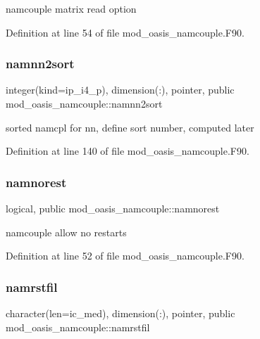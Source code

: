 namcouple matrix read option 



Definition at line 54 of file mod\+\_\+oasis\+\_\+namcouple.\+F90.

\mbox{\label{namespacemod__oasis__namcouple_a0ace7c451d8658759b9c8d871926a76e}} 
\subsubsection{\texorpdfstring{namnn2sort}{namnn2sort}}
{\footnotesize\ttfamily integer(kind=ip\+\_\+i4\+\_\+p), dimension(\+:), pointer, public mod\+\_\+oasis\+\_\+namcouple\+::namnn2sort}



sorted namcpl for nn, define sort number, computed later 



Definition at line 140 of file mod\+\_\+oasis\+\_\+namcouple.\+F90.

\mbox{\label{namespacemod__oasis__namcouple_ad1bd3ea485ad5f5114eb4b7f8c831ccb}} 
\subsubsection{\texorpdfstring{namnorest}{namnorest}}
{\footnotesize\ttfamily logical, public mod\+\_\+oasis\+\_\+namcouple\+::namnorest}



namcouple allow no restarts 



Definition at line 52 of file mod\+\_\+oasis\+\_\+namcouple.\+F90.

\mbox{\label{namespacemod__oasis__namcouple_a54f4b8262f809a20928092782bc78345}} 
\subsubsection{\texorpdfstring{namrstfil}{namrstfil}}
{\footnotesize\ttfamily character(len=ic\+\_\+med), dimension(\+:), pointer, public mod\+\_\+oasis\+\_\+namcouple\+::namrstfil}



